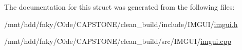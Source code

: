 The documentation for this struct was generated from the following files\+:\begin{DoxyCompactItemize}
\item 
/mnt/hdd/fnky/\+C0de/\+C\+A\+P\+S\+T\+O\+N\+E/clean\+\_\+build/include/\+I\+M\+G\+U\+I/\hyperlink{imgui_8h}{imgui.\+h}\item 
/mnt/hdd/fnky/\+C0de/\+C\+A\+P\+S\+T\+O\+N\+E/clean\+\_\+build/src/\+I\+M\+G\+U\+I/\hyperlink{imgui_8cpp}{imgui.\+cpp}\end{DoxyCompactItemize}
